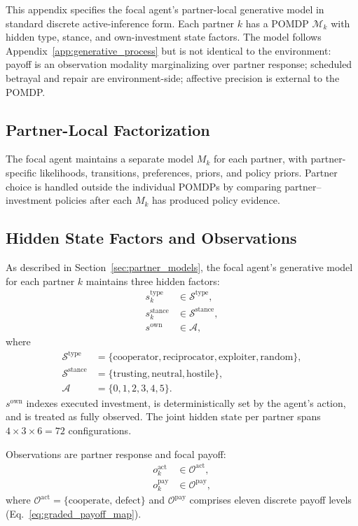 \documentclass[runningheads,orivec]{llncs}
\begin{document}
This appendix specifies the focal agent's partner-local generative model in standard discrete active-inference form. Each partner \(k\) has a POMDP \(\mathcal{M}_k\) with hidden type, stance, and own-investment state factors. The model follows Appendix~\ref{app:generative_process} but is not identical to the environment: payoff is an observation modality marginalizing over partner response; scheduled betrayal and repair are environment-side; affective precision is external to the POMDP.

\subsection{Partner-Local Factorization}

The focal agent maintains a separate model \(M_k\) for each partner, with partner-specific likelihoods, transitions, preferences, priors, and policy priors. Partner choice is handled outside the individual POMDPs by comparing partner--investment policies after each \(M_k\) has produced policy evidence.

\subsection{Hidden State Factors and Observations}

As described in Section~\ref{sec:partner_models}, the focal agent's generative model for each partner $k$ maintains three hidden factors:
\begin{align}
s_k^{\text{type}} &\in \mathcal{S}^{\text{type}}, \label{eq:s_type} \\
s_k^{\text{stance}} &\in \mathcal{S}^{\text{stance}}, \label{eq:s_stance} \\
s^{\mathrm{own}} &\in \mathcal{A}, \nonumber
\end{align}
where
\begin{align*}
\mathcal{S}^{\text{type}} &= \{\mathrm{cooperator},\mathrm{reciprocator},\mathrm{exploiter},\mathrm{random}\}, \\
\mathcal{S}^{\text{stance}} &= \{\mathrm{trusting},\mathrm{neutral},\mathrm{hostile}\}, \\
\mathcal{A} &= \{0,1,2,3,4,5\}.
\end{align*}
\(s^{\mathrm{own}}\) indexes executed investment, is deterministically set by the agent's action, and is treated as fully observed. The joint hidden state per partner spans \(4\times3\times6=72\) configurations.

Observations are partner response and focal payoff:
\begin{align}
o_k^{\text{act}} &\in \mathcal{O}^{\text{act}}, \nonumber \\
o_k^{\text{pay}} &\in \mathcal{O}^{\text{pay}}, \nonumber
\end{align}
where $\mathcal{O}^{\text{act}}=\{\text{cooperate, defect}\}$ and $\mathcal{O}^{\text{pay}}$ comprises eleven discrete payoff levels (Eq.~\eqref{eq:graded_payoff_map}).
\end{document}
